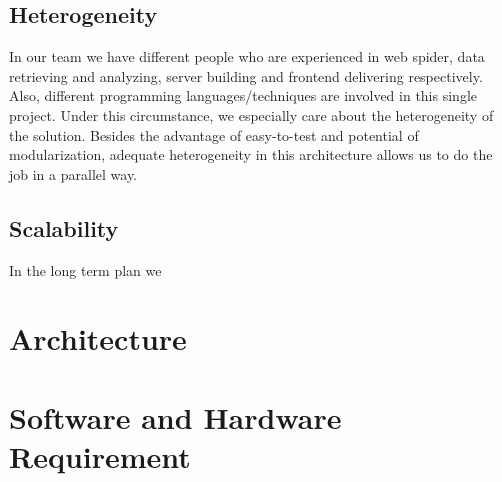 \documentclass[10pt]{article}
\begin{document}
		\subsection{Heterogeneity}
		 In our team we have different people who are experienced in web spider, data retrieving and analyzing, server building and frontend delivering respectively. Also, different programming languages/techniques are involved in this single project. Under this circumstance, we especially care about the heterogeneity of the solution. Besides the advantage of easy-to-test and potential of modularization, adequate heterogeneity in this architecture allows us to do the job in a parallel way.

		\subsection{Scalability}
		In the long term plan we

	\section{Architecture}

	\section{Software and Hardware Requirement}
\end{document}
